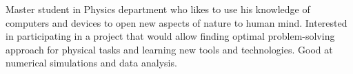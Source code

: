 

\begin{cvparagraph}

Master student in Physics department who likes to use his knowledge of computers and devices to open new aspects of nature to human mind. Interested in participating in a project that would allow finding optimal problem-solving approach for physical tasks and learning new tools and technologies. Good at numerical simulations and data analysis.
\end{cvparagraph}